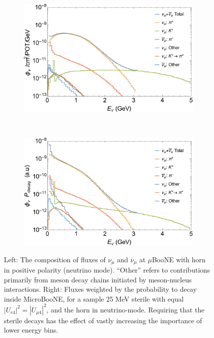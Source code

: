 \documentclass[11pt, a4paper]{article}
\def\muboone{MicroBooNE}
\begin{document}
\begin{figure}[t]
\center
\begin{subfigure}[t]{0.5\textwidth}
	\includegraphics[width=\textwidth]{figures/microBooNE_flux.pdf} 
\end{subfigure}%
~
\begin{subfigure}[t]{0.5\textwidth}
\includegraphics[width=\textwidth]{figures/microBooNE_flux_weighted.pdf}
\end{subfigure}
\caption{\label{fig:flux_plots} Left: The composition of fluxes of $\nu_\mu$ and $\overline{\nu}_\mu$ at $\mu$BooNE with horn in positive polarity (neutrino mode). ``Other'' refers to contributions primarily from meson decay chains initiated by meson-nucleus interactions. Right: Fluxes weighted by the probability to decay inside \muboone, for a sample 25 MeV sterile with equal $|U_{e4}|^2 = |U_{\mu 4}|^2$, and the horn in neutrino-mode. Requiring that the sterile decays has the effect of vastly increasing the importance of lower energy bins. }

\end{figure}
\end{document}
